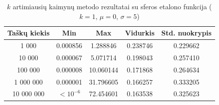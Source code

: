 \begin{table}[H]
    \centering
    \begin{tabular}{|c|c|c|c|c|}
        \hline
        \textbf{Taškų kiekis} & \textbf{Min} & \textbf{Max} & \textbf{Vidurkis} & \textbf{Std. nuokrypis} \\ \hline
        1 000        & 0.000856 & 1.288846 & 0.238746 & 0.229662 \\ \hline
        10 000       & 0.000067 & 5.071714 & 0.198043 & 0.257410 \\ \hline
        100 000      & 0.000008 & 10.060144 & 0.171868 & 0.264634 \\ \hline
        1 000 000    & 0.000001 & 31.796605 & 0.166257 & 0.333205 \\ \hline
        10 000 000   & $<10^{-6}$ & 72.454601 & 0.163538 & 0.325623 \\ \hline
    \end{tabular}
    \caption{$k$ artimiausių kaimynų metodo rezultatai su sferos etalono funkcija ($k = 1$, $\mu = 0$, $\sigma = 5$)}
\end{table}